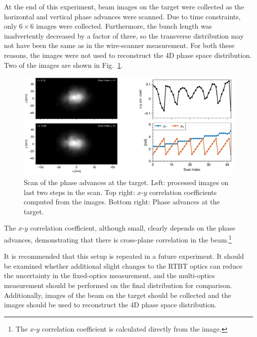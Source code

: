 At the end of this experiment, beam images on the target were collected as the horizontal and vertical phase advances were scanned. Due to time constraints, only $6 \times 6$ images were collected. Furthermore, the bunch length was inadvertently decreased by a factor of three, so the transverse distribution may not have been the same as in the wire-scanner measurement. For both these reasons, the images were not used to reconstruct the 4D phase space distribution. Two of the images are shown in Fig.~\ref{fig:exp3_target_scan}. 
%
\begin{figure}[!p]
    \centering
    \includegraphics[width=\textwidth]{Images/chapter5/exp3/target_scan/target_scan.png}
    \caption{Scan of the phase advances at the target. Left: processed images on last two steps in the scan. Top right: $x$-$y$ correlation coefficients computed from the images. Bottom right: Phase advances at the target.}
    \label{fig:exp3_target_scan}
\end{figure}
%
The $x$-$y$ correlation coefficient, although small, clearly depends on the phase advances, demonstrating that there is cross-plane correlation in the beam.\footnote{The $x$-$y$ correlation coefficient is calculated directly from the image.}

It is recommended that this setup is repeated in a future experiment. It should be examined whether additional slight changes to the RTBT optics can reduce the uncertainty in the fixed-optics measurement, and the multi-optics measurement should be performed on the final distribution for comparison. Additionally, images of the beam on the target should be collected and the images should be used to reconstruct the 4D phase space distribution.

